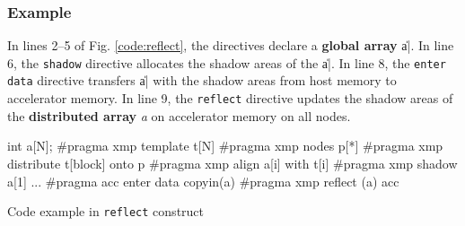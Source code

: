 \subsubsection*{Example}

In lines 2--5 of Fig. \ref{code:reflect},
the directives declare a {\bf global array} \|a|.
In line 6, 
the {\tt shadow} directive allocates the shadow areas of the \|a|.
In line 8,
the {\tt enter data} directive transfers \|a| with the shadow areas from
host memory to accelerator memory.
In line 9,
the {\tt reflect} directive updates the shadow areas of the {\bf
distributed array} {\it a} on accelerator memory on all nodes.

\begin{myfigure}
\begin{minipage}{0.45\hsize}
\begin{center}
\end{center}
\end{minipage}
%
\begin{minipage}{0.53\hsize}
\begin{center}
\begin{XACCCexampleR}
int a[N];
#pragma xmp template t[N]
#pragma xmp nodes p[*]
#pragma xmp distribute t[block] onto p
#pragma xmp align a[i] with t[i]
#pragma xmp shadow a[1]
...
#pragma acc enter data copyin(a)
#pragma xmp reflect (a) acc
\end{XACCCexampleR}
\end{center}
\end{minipage}
\caption{Code example in {\tt reflect} construct}\label{code:reflect}
\end{myfigure}



